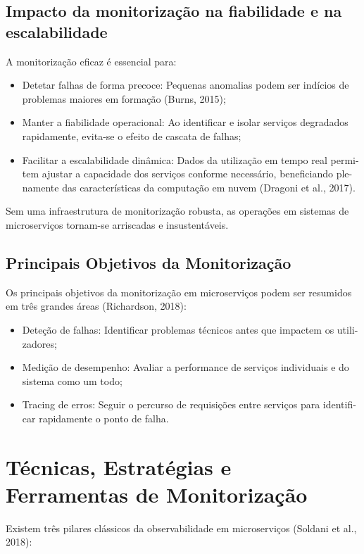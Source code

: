 \subsection{Impacto da monitorização na fiabilidade e na escalabilidade}

A monitorização eficaz é essencial para:

\begin{itemize}
    \item Detetar falhas de forma precoce: Pequenas anomalias podem ser indícios de problemas maiores em formação (Burns, 2015);
    \item Manter a fiabilidade operacional: Ao identificar e isolar serviços degradados rapidamente, evita-se o efeito de cascata de falhas;
    \item Facilitar a escalabilidade dinâmica: Dados da utilização em tempo real permi-tem ajustar a capacidade dos serviços conforme necessário, beneficiando ple-namente das características da computação em nuvem (Dragoni et al., 2017).
\end{itemize}

Sem uma infraestrutura de monitorização robusta, as operações em sistemas de microserviços tornam-se arriscadas e insustentáveis.

\subsection{Principais Objetivos da Monitorização}

Os principais objetivos da monitorização em microserviços podem ser resumidos em três grandes áreas (Richardson, 2018):

\begin{itemize}
    \item Deteção de falhas: Identificar problemas técnicos antes que impactem os utili-zadores;
    \item Medição de desempenho: Avaliar a performance de serviços individuais e do sistema como um todo;
    \item Tracing de erros: Seguir o percurso de requisições entre serviços para identifi-car rapidamente o ponto de falha.
\end{itemize}

\section{Técnicas, Estratégias e Ferramentas de Monitorização}

Existem três pilares clássicos da observabilidade em microserviços (Soldani et al., 2018):

